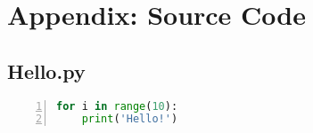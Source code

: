 \documentclass{ExpReport}
\begin{document}

\newpage
\section{Appendix: Source Code}
\subsection{Hello.py}
\begin{lstlisting}[language=Python, numbers=left, numbersep=1em, frame=single]
for i in range(10):
    print('Hello!')
\end{lstlisting}

\end{document}
